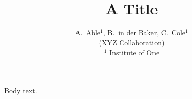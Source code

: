 \documentclass[aps,prd,twocolumn]{revtex4-1}
\begin{document}
\title{A Title}
\author{A.~Able$^{1}$, B.~in der Baker, C.~Cole$^{1}$\\
(XYZ Collaboration)\\
$^{1}$ Institute of One}
\maketitle
Body text.
\end{document}
